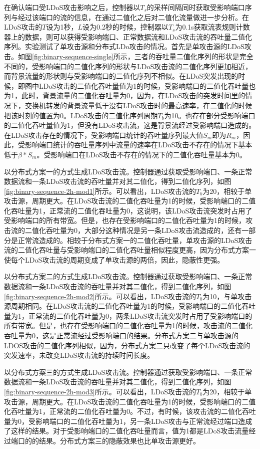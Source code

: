 在确认端口受LDoS攻击影响之后，控制器以$T_s$的采样间隔同时获取受影响端口序列与经过该端口的流的信息，在通过二值化之后对二值化流量做进一步分析。在LDoS攻击的$T$设为1秒，$L$设为0.2秒的时候，控制器以$T_s$为0.1s获取流表规则计数器上的数据，则可以获得受影响端口、正常数据流和LDoS攻击流的吞吐量二值化序列。实验测试了单攻击源和分布式LDo攻击的情况。首先是单攻击源的LDoS攻击。如图\ref{fig:binary-sequence-single}所示，三者的吞吐量二值化序列的形状是完全不同的，受影响端口的二值化序列的形状与LDoS攻击流的二值化序列更加相近，而背景流量的形状则与受影响端口的二值化序列不相似。在LDoS突发出现的时候，即图中LDoS攻击的二值化吞吐量值为1的时候，受影响端口的二值化吞吐量也为1，此时，背景流量的二值化吞吐量为0，因为，在LDoS攻击的突发时间里的情况下，交换机转发的背景流量低于没有LDoS攻击时的最高速率，在二值化的时候把该时刻的值置为0。LDoS攻击的二值化序列周期$T_b$为10。也存在部分受影响端口的二值化吞吐量值为1，但没有LDoS攻击流，这是背景流经过受影响端口造成的。在LDoS攻击存在的情况下，受影响端口统计的吞吐量序列最大值$S_m$即为$R_m$，因此，受影响端口统计的吞吐量序列中流量的速率在LDoS攻击不存在的情况下基本低于$\beta * S_m$。受影响端口在LDoS攻击不存在的情况下的二值化吞吐量基本为0。

以分布式方案一的方式生成LDoS攻击流。控制器通过获取受影响端口、一条正常数据流和一条LDoS攻击流的吞吐量并对其二值化，得到二值化序列，如图\ref{fig:binary-sequence-2h-mod1}所示。可以看出，LDoS攻击流的$T_b$为20，相较于单攻击源，周期更大。在LDoS攻击流的二值化吞吐量为1的时候，受影响端口的二值化吞吐量为1，正常流的二值化吞吐量为0，这说明，该LDoS攻击流突发时占用了受影响端口的所有带宽。但是，也存在受影响端口的二值化吞吐量为1的时候，攻击流的二值化吞吐量为0，大部分这种情况是另一条LDoS攻击流造成的，还有一部分是正常流造成的。相较于分布式方案一的二值化吞吐量，单攻击源的LDoS攻击流的二值化吞吐量与受影响端口的二值化吞吐量相似程度更高，因为分布式方案一使每个LDoS攻击流的周期变成了单攻击源的两倍，因此，隐蔽性更强。


以分布式方案二的方式生成LDoS攻击流。控制器通过获取受影响端口、一条正常数据流和一条LDoS攻击流的吞吐量并对其二值化，得到二值化序列，如图\ref{fig:binary-sequence-2h-mod2}所示。可以看出，LDoS攻击流的$T_b$为10，与单攻击源周期相同。在LDoS攻击流的二值化吞吐量为1的时候，受影响端口的二值化吞吐量为1，正常流的二值化吞吐量为0，两条LDoS攻击流突发时占用了受影响端口的所有带宽。但是，也存在受影响端口的二值化吞吐量为1的时候，攻击流的二值化吞吐量为0，这是正常流经过受影响端口的结果。分布式方案二与单攻击源的LDOS攻击的二值化序列相似，因为，分布式方案二只改变了每个LDoS攻击流的突发速率，未改变LDoS攻击流的持续时间长度。

以分布式方案三的方式生成LDoS攻击流。控制器通过获取受影响端口、一条正常数据流和一条LDoS攻击流的吞吐量并对其二值化，得到二值化序列，如图\ref{fig:binary-sequence-2h-mod3}所示。可以看出，LDoS攻击流的$T_b$为20，相较于单攻击源，周期更大。在LDoS攻击流的二值化吞吐量为1的时候，受影响端口的二值化吞吐量为1，正常流的二值化吞吐量为0。不过，有时候，该攻击流的二值化吞吐量为0，受影响端口的二值化吞吐量为1，另一条LDoS攻击与正常流经过端口造成了这样的结果。对于受影响端口的二值化吞吐量而言，值为1都是LDoS攻击流量经过端口的的结果。分布式方案三的隐蔽效果也比单攻击源更好。

